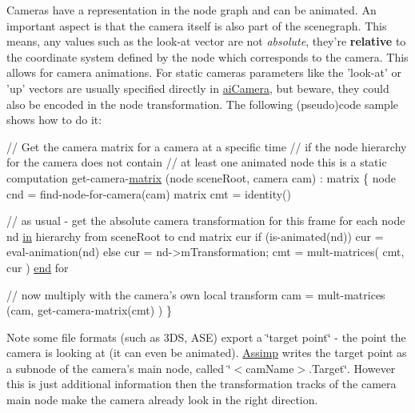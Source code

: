 Cameras have a representation in the node graph and can be animated. An important aspect is that the camera itself is also part of the scenegraph. This means, any values such as the look-\/at vector are not {\itshape absolute}, they're {\bfseries relative} to the coordinate system defined by the node which corresponds to the camera. This allows for camera animations. For static cameras parameters like the 'look-\/at' or 'up' vectors are usually specified directly in \hyperlink{structai_camera}{ai\-Camera}, but beware, they could also be encoded in the node transformation. The following (pseudo)code sample shows how to do it\-: \par
\par
 
\begin{DoxyCode}
\textcolor{comment}{// Get the camera matrix for a camera at a specific time}
\textcolor{comment}{// if the node hierarchy for the camera does not contain}
\textcolor{comment}{// at least one animated node this is a static computation}
\textcolor{keyword}{get}-camera-\hyperlink{glew_8h_a7b24a3f2f56eb1244ae69dacb4fecb6f}{matrix} (node sceneRoot, camera cam) : matrix
\{
   node   cnd = find-node-\textcolor{keywordflow}{for}-camera(cam)
   matrix cmt = identity()

   \textcolor{comment}{// as usual - get the absolute camera transformation for this frame}
   for each node nd \hyperlink{glew_8h_a83ad0ee7f1e06b59c90271716e689080}{in} hierarchy from sceneRoot to cnd
     matrix cur
     if (is-animated(nd))
        cur = eval-animation(nd)
     else cur = nd->mTransformation;
     cmt = mult-matrices( cmt, cur )
   \hyperlink{glew_8h_a432111147038972f06e049e18a837002}{end} for

   \textcolor{comment}{// now multiply with the camera's own local transform}
   cam = mult-matrices (cam, get-camera-matrix(cmt) )
\}
\end{DoxyCode}


\begin{DoxyNote}{Note}
some file formats (such as 3\-D\-S, A\-S\-E) export a \char`\"{}target point\char`\"{} -\/ the point the camera is looking at (it can even be animated). \hyperlink{namespace_assimp}{Assimp} writes the target point as a subnode of the camera's main node, called \char`\"{}$<$cam\-Name$>$.\-Target\char`\"{}. However this is just additional information then the transformation tracks of the camera main node make the camera already look in the right direction. 
\end{DoxyNote}


